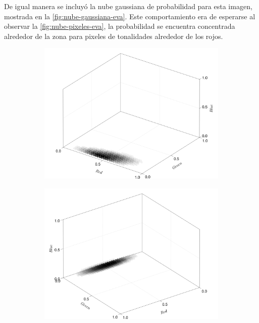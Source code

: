 De igual manera se incluyó la nube gaussiana de probabilidad para esta imagen, mostrada en la \cref{fig:nube-gaussiana-eva}. Este comportamiento era de esperarse al observar la \cref{fig:nube-pixeles-eva}, la probabilidad se encuentra concentrada alrededor de la zona para pixeles de tonalidades alrededor de los rojos.
\begin{figure}[ht!]
    \centering
    \begin{subfigure}[c]{0.3\textwidth}
        \centering
        \includegraphics[scale=0.09]{../pictures/gaussian_cloud_eva_1}
    \end{subfigure}
    \begin{subfigure}[c]{0.3\textwidth}
        \centering
        \includegraphics[scale=0.09]{../pictures/gaussian_cloud_eva_2}

\end{subfigure}
\end{figure}
